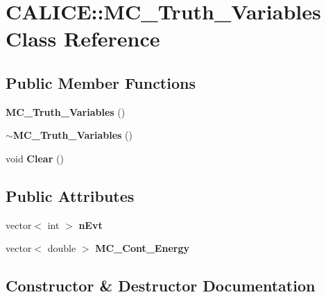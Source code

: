 \section{C\-A\-L\-I\-C\-E\-:\-:M\-C\-\_\-\-Truth\-\_\-\-Variables Class Reference}
\label{classCALICE_1_1MC__Truth__Variables}
\subsection*{Public Member Functions}
\begin{DoxyCompactItemize}
\item 
{\bf M\-C\-\_\-\-Truth\-\_\-\-Variables} ()
\item 
{\bf $\sim$\-M\-C\-\_\-\-Truth\-\_\-\-Variables} ()
\item 
void {\bfseries Clear} ()\label{classCALICE_1_1MC__Truth__Variables_a907f4ef5d3a9ba7acfb75d4cae6316d8}

\end{DoxyCompactItemize}
\subsection*{Public Attributes}
\begin{DoxyCompactItemize}
\item 
vector$<$ int $>$ {\bfseries n\-Evt}\label{classCALICE_1_1MC__Truth__Variables_ade7a1e9eb44abf1d9b87a7c62bcc37ca}

\item 
vector$<$ double $>$ {\bfseries M\-C\-\_\-\-Cont\-\_\-\-Energy}\label{classCALICE_1_1MC__Truth__Variables_a0be460f76408acfb09ddd188ea8c31d0}

\end{DoxyCompactItemize}


\subsection{Constructor \& Destructor Documentation}
